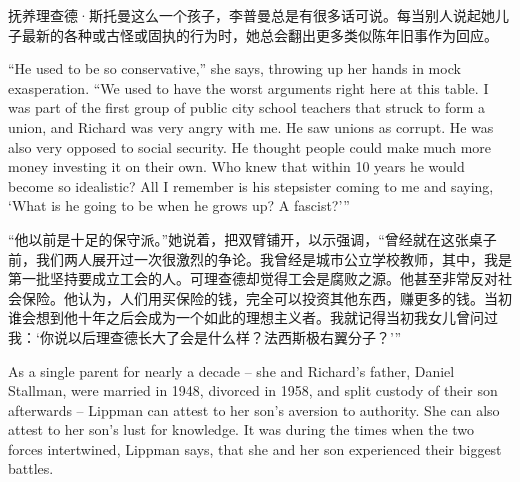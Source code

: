 \ifdefined\chs
抚养理查德·斯托曼这么一个孩子，李普曼总是有很多话可说。每当别人说起她儿子最新的各种或古怪或固执的行为时，她总会翻出更多类似陈年旧事作为回应。
\fi

\ifdefined\eng
``He used to be so conservative,'' she says, throwing up her hands in mock exasperation. ``We used to have the worst arguments right here at this table. I was part of the first group of public city school teachers that struck to form a union, and Richard was very angry with me. He saw unions as corrupt. He was also very opposed to social security. He thought people could make much more money investing it on their own. Who knew that within 10 years he would become so idealistic? All I remember is his stepsister coming to me and saying, `What is he going to be when he grows up? A fascist?'\hspace{0.01in}''
\fi

\ifdefined\chs
``他以前是十足的保守派。''她说着，把双臂铺开，以示强调，``曾经就在这张桌子前，我们两人展开过一次很激烈的争论。我曾经是城市公立学校教师，其中，我是第一批坚持要成立工会的人。可理查德却觉得工会是腐败之源。他甚至非常反对社会保险。他认为，人们用买保险的钱，完全可以投资其他东西，赚更多的钱。当初谁会想到他十年之后会成为一个如此的理想主义者。我就记得当初我女儿曾问过我：`你说以后理查德长大了会是什么样？法西斯极右翼分子？'\hspace{0.01in}''
\fi

\ifdefined\eng
As a single parent for nearly a decade -- she and Richard's father, Daniel Stallman, were married in 1948, divorced in 1958, and split custody of their son afterwards -- Lippman can attest to her son's aversion to authority. She can also attest to her son's lust for knowledge. It was during the times when the two forces intertwined, Lippman says, that she and her son experienced their biggest battles.
\fi

